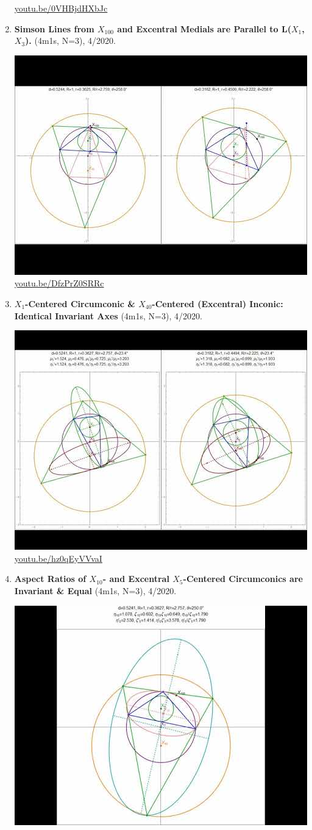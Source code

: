 \documentclass[12pt]{amsart}
\begin{document}
\begin{enumerate}[resume]
\begin{center}
\href{https://youtu.be/0VHBjdHXbJc}{\url{youtu.be/0VHBjdHXbJc}}\end{center}
% 
\item \textbf{Simson Lines from $X_{100}$ and Excentral Medials are Parallel to L($X_{1}$, $X_{3}$).} (4m1s, N=3), 4/2020. 
\begin{center}\includegraphics[width=.5\textwidth]{pics/DfzPrZ0SRRc.jpg} \\ 
\href{https://youtu.be/DfzPrZ0SRRc}{\url{youtu.be/DfzPrZ0SRRc}}\end{center}
% 
\item \textbf{$X_{1}$-Centered Circumconic \& $X_{40}$-Centered (Excentral) Inconic: Identical Invariant Axes} (4m1s, N=3), 4/2020. 
\begin{center}\includegraphics[width=.5\textwidth]{pics/hz0qEyVVvaI.jpg} \\ 
\href{https://youtu.be/hz0qEyVVvaI}{\url{youtu.be/hz0qEyVVvaI}}\end{center}
% 
\item \textbf{Aspect Ratios of $X_{10}$- and Excentral $X_{5}$-Centered Circumconics are Invariant \& Equal} (4m1s, N=3), 4/2020. 
\begin{center}\includegraphics[width=.5\textwidth]{pics/-4AAUSFxvmo.jpg} \\ 

\end{center}
\end{enumerate}
\end{document}
